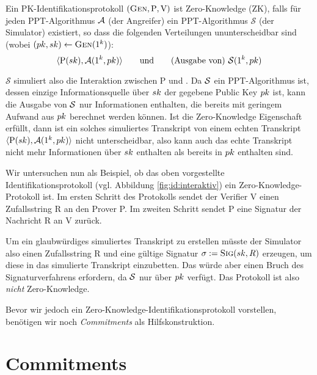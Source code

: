 \begin{definition}
  \label{def:zk}
  Ein PK-Identifikationsprotokoll $(\textsc{Gen}, \mathrm{P}, \mathrm{V})$ ist
  Zero-Knowledge (ZK), falls für jeden PPT-Algorithmus $\mathcal{A}$ (der
  Angreifer) ein PPT-Algorithmus $\mathcal{S}$ (der Simulator) existiert,
  so dass die folgenden Verteilungen ununterscheidbar sind (wobei
  $(pk, sk) \leftarrow \textsc{Gen}(1^k)$):
  \[
    \langle \mathrm{P}(sk), \mathcal{A}(1^k, pk) \rangle \text{\qquad und\qquad (Ausgabe von) } \mathcal{S}(1^k, pk)
  \]
\end{definition}

$\mathcal{S}$ simuliert also die Interaktion zwischen P und \A. Da
$\mathcal{S}$ ein PPT-Algorithmus ist, dessen einzige Informationsquelle über
$sk$ der gegebene Public Key $pk$ ist, kann die Ausgabe von $\mathcal{S}$
nur Informationen enthalten, die bereits mit geringem Aufwand aus
$pk$ berechnet werden können. Ist die Zero-Knowledge Eigenschaft
erfüllt, dann ist ein solches simuliertes Transkript von einem echten
Transkript $\langle \mathrm{P}(sk), \mathcal{A}(1^k, pk) \rangle$ nicht
unterscheidbar, also kann auch das echte Transkript nicht mehr
Informationen über $sk$ enthalten als bereits in $pk$ enthalten
sind.

Wir untersuchen nun als Beispiel, ob das oben vorgestellte
Identifikationsprotokoll (vgl. Abbildung \ref{fig:id:interaktiv}) ein
Zero-Knowledge-Protokoll ist. Im ersten Schritt des Protokolls sendet
der Verifier V einen Zufallsstring R an den Prover P. Im zweiten Schritt
sendet P eine Signatur der Nachricht R an V zurück.

Um ein glaubwürdiges simuliertes Transkript zu erstellen müsste der
Simulator also einen Zufallsstring R und eine gültige Signatur $\sigma
:= \textsc{Sig}(sk, R)$ erzeugen, um diese in das simulierte Transkript
einzubetten. Das würde aber einen Bruch des Signaturverfahrens
erfordern, da $\mathcal{S}$ nur über $pk$ verfügt. Das Protokoll ist also
\emph{nicht} Zero-Knowledge.

Bevor wir jedoch ein Zero-Knowledge-Identifikationsprotokoll vorstellen,
benötigen wir noch \emph{Commitments} als Hilfskonstruktion.
\section{Commitments}

